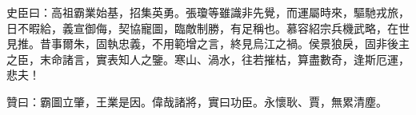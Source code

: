 \begin{pinyinscope}
 史臣曰：高祖霸業始基，招集英勇。張瓊等雖識非先覺，而運屬時來，驅馳戎旅，日不暇給，義宣御侮，契協寵圖，臨敵制勝，有足稱也。慕容紹宗兵機武略，在世見推。昔事爾朱，固執忠義，不用範增之言，終見烏江之禍。侯景狼戾，固非後主之臣，末命諸言，實表知人之鑒。寒山、渦水，往若摧枯，算盡數奇，逢斯厄運，悲夫！



 贊曰：霸圖立肇，王業是因。偉哉諸將，實曰功臣。永懷耿、賈，無累清塵。



\end{pinyinscope}